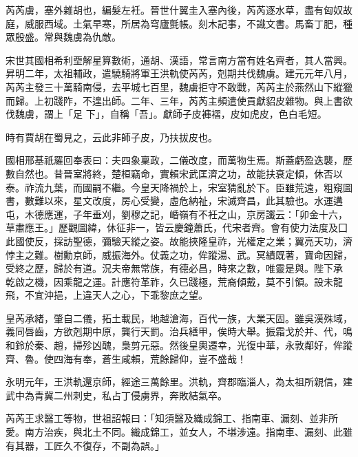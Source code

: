 
\begin{pinyinscope}

 芮芮虜，塞外雜胡也，編髮左衽。晉世什翼圭入塞內後，芮芮逐水草，盡有匈奴故庭，威服西域。土氣早寒，所居為穹廬氈帳。刻木記事，不識文書。馬畜丁肥，種眾殷盛。常與魏虜為仇敵。



 宋世其國相希利垔解星算數術，通胡、漢語，常言南方當有姓名齊者，其人當興。昇明二年，太祖輔政，遣驍騎將軍王洪軌使芮芮，剋期共伐魏虜。建元元年八月，芮芮主發三十萬騎南侵，去平城七百里，魏虜拒守不敢戰，芮芮主於燕然山下縱獵而歸。上初踐阼，不遑出師。二年、三年，芮芮主頻遣使貢獻貂皮雜物。與上書欲伐魏虜，謂上「足
 下」，自稱「吾」。獻師子皮褲褶，皮如虎皮，色白毛短。



 時有賈胡在蜀見之，云此非師子皮，乃扶拔皮也。



 國相邢基祇羅回奉表曰：夫四象稟政，二儀改度，而萬物生焉。斯蓋虧盈迭襲，歷數自然也。昔晉室將終，楚桓竊命，實賴宋武匡濟之功，故能扶衰定傾，休否以泰。祚流九葉，而國嗣不繼。今皇天降禍於上，宋室猜亂於下。臣雖荒遠，粗窺圖書，數難以來，星文改度，房心受變，虛危納祉，宋滅齊昌，此其驗也。水運遘屯，木德應運，子年垂刈，劉穆之記，崏嶺有不衽之山，京房讖云：「卯金十六，草肅應王。」歷觀圖緯，休征非一，皆云慶鐘蕭氏，代宋者齊。會有使力法度及囗此國使反，採訪聖德，彌驗天縱之姿。故能挾隆皇祚，光權定之業；翼亮天功，濟悖主之難。樹勳京師，威振海外。仗義之功，侔蹤湯、武。冥績既著，寶命因歸，受終之歷，歸於有道。況夫帝無常族，有德必昌，時來之數，唯靈是與。陛下承
 乾啟之機，因乘龍之運。計應符革祚，久已踐極，荒裔傾戴，莫不引領。設未龍飛，不宜沖挹，上違天人之心，下乖黎庶之望。



 皇芮承緒，肇自二儀，拓土載民，地越滄海，百代一族，大業天固。雖吳漢殊域，義同唇齒，方欲剋期中原，龔行天罰。治兵繕甲，俟時大舉。振霜戈於并、代，鳴和鈴於秦、趙，掃殄凶醜，梟剪元惡。然後皇輿遷幸，光復中華，永敦鄰好，侔蹤齊、魯。使四海有奉，蒼生咸賴，荒餘歸仰，豈不盛哉！



 永明元年，王洪軌還京師，經途三萬餘里。洪軌，齊郡臨淄人，為太祖所親信，建武中為青冀二州刺史，私占丁侵虜界，奔敗結氣卒。



 芮芮王求醫工等物，世祖詔報曰：「知須醫及織成錦工、指南車、漏刻、並非所愛。南方治疾，與北土不同。織成錦工，並女人，不堪涉遠。指南車、漏刻、此雖有其器，工匠久不復存，不副為誤。」




\end{pinyinscope}
